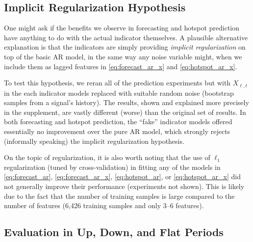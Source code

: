 \documentclass[9pt,twocolumn,twoside,lineno]{pnas-new}
\begin{document}
\subsection{Implicit Regularization Hypothesis}

One might ask if the benefits we observe in forecasting and hotspot
prediction have anything to do with the actual indicator themselves. A plausible  
alternative explanation is that the indicators are simply providing \textit{implicit
  regularization} on top of the basic AR model, in the same way any noise
variable might, when we include them as lagged
features in \eqref{eq:forecast_ar_x} and \eqref{eq:hotspot_ar_x}.

To test this hypothesis, we reran all of the prediction experiments but with
$X_{\ell,t}$ in the each indicator models replaced with suitable random noise
(bootstrap samples from a signal's history).  The results, shown and explained
more precisely in the supplement, are vastly different (worse) than the original
set of results.  In both forecasting and hotspot prediction, the ``fake''
indicator models offered essentially no improvement over the pure AR model,
which strongly rejects (informally speaking) the implicit regularization
hypothesis.        

On the topic of regularization, it is also worth noting that the use of 
$\ell_1$ regularization (tuned by cross-validation) in fitting any of the models
in \eqref{eq:forecast_ar}, \eqref{eq:forecast_ar_x}, \eqref{eq:hotspot_ar}, or 
\eqref{eq:hotspot_ar_x} did not generally improve their performance
(experiments not shown).  This is likely due to the fact that the number of
training samples is large compared to the number of features (6,426 training
samples and only 3--6 features). 

\subsection{Evaluation in Up, Down, and Flat Periods}
\end{document}
